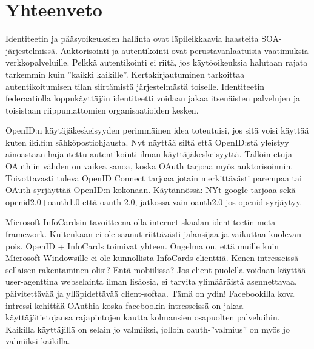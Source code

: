 \documentclass[finnish,gradu]{tktltiki}
\begin{document}

\section{Yhteenveto} %
\label{sec:yhteenveto}

  Identiteetin ja pääsyoikeuksien hallinta ovat läpileikkaavia haasteita SOA-järjestelmissä.
  Auktorisointi ja autentikointi ovat perustavanlaatuisia vaatimuksia verkkopalveluille. Pelkkä autentikointi ei riitä, jos käytöoikeuksia halutaan rajata tarkemmin kuin ''kaikki kaikille''. Kertakirjautuminen tarkoittaa autentikoitumisen tilan siirtämistä järjestelmästä toiselle. Identiteetin federaatiolla loppukäyttäjän identiteetti voidaan jakaa itsenäisten palvelujen ja toisistaan riippumattomien organisaatioiden kesken.

    OpenID:n käytäjäkeskeisyyden perimmäinen idea toteutuisi, jos sitä voisi käyttää kuten iki.fi:n sähköpostiohjausta. Nyt näyttää siltä että OpenID:stä yleistyy ainoastaan hajautettu autentikointi ilman käyttäjäkeskeisyyttä. Tällöin etuja OAuthiin vähden on vaikea sanoa, koska OAuth tarjoaa myös auktorisoinnin. Toivottavasti tuleva OpenID Connect tarjoaa jotain merkittävästi parempaa tai OAuth syrjäyttää OpenID:n kokonaan. Käytännössä: NYt google tarjoaa sekä openid2.0+oauth1.0 että oauth 2.0, jatkossa vain oauth2.0 jos openid syrjäytyy.

 Microsoft InfoCardsin tavoitteena olla internet-skaalan identiteetin meta-framework. Kuitenkaan ei ole saanut riittävästi jalansijaa ja vaikuttaa kuolevan pois. OpenID + InfoCards toimivat yhteen. Ongelma on, että muille kuin Microsoft Windowsille ei ole kunnollista InfoCards-clienttiä. Kenen intresseissä sellaisen rakentaminen olisi? Entä mobiilissa? Jos client-puolella voidaan käyttää user-agenttina webselainta ilman lisäosia, ei tarvita ylimääräistä asennettavaa, päivitettävää ja ylläpidettävää client-softaa. Tämä on ydin! Facebookilla kova intressi kehittää OAuthia koska facebookin intresseissä on jakaa käyttäjätietojansa rajapintojen kautta kolmansien osapuolten palveluihin. Kaikilla käyttäjillä on selain jo valmiiksi, jolloin oauth-''valmius'' on myös jo valmiiksi kaikilla.







\lastpage
\end{document}
